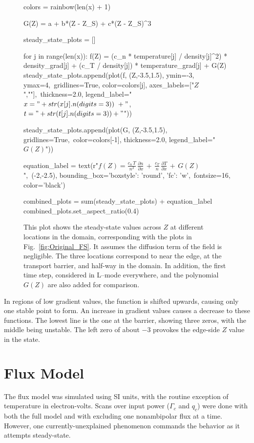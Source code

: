 \begin{figure}[tb]
\begin{sagesilent}
		colors = rainbow(len(x) + 1)

		G(Z) = a + b*(Z - Z_S) + c*(Z - Z_S)^3

		steady_state_plots = []

		for j in range(len(x)):
		    f(Z) = (c_n * temperature[j] / density[j]^2) * density_grad[j] + (c_T / density[j]) * temperature_grad[j] + G(Z)
		    steady_state_plots.append(plot(f, (Z,-3.5,1.5), ymin=-3, ymax=4,\
		    		gridlines=True, color=colors[j], axes_labels=["$Z$",""],\
		    		thickness=2.0, legend_label="$x = " +str(x[j].n(digits=3))\
		    		+"$, $t = " +str(t[j].n(digits=3))+ "$"))

		steady_state_plots.append(plot(G, (Z,-3.5,1.5), gridlines=True,\
				color=colors[-1], thickness=2.0, legend_label="$G(Z)$"))

		equation_label = text(r"$f(Z) = \frac{c_n \, T}{n^2} \, \frac{\partial n}{\partial x} \,+\, \frac{c_T}{n} \, \frac{\partial T}{\partial x} \,+\, G(Z)$",\
				(-2,-2.5), bounding_box={'boxstyle': 'round', 'fc': 'w'},\
				fontsize=16, color='black')

		combined_plots = sum(steady_state_plots) + equation_label
		combined_plots.set_aspect_ratio(0.4)
	\end{sagesilent}
	\sageplot[width=0.9\textwidth]{combined_plots}
	\caption{This plot shows the steady-state values across $Z$ at different locations in the domain, corresponding with the plots in Fig.~\ref{fig:Original_FS}.
	It assumes the diffusion term of the field is negligible.
	The three locations correspond to near the edge, at the transport barrier, and half-way in the domain.
	In addition, the first time step, considered in L--mode everywhere, and the polynomial $G(Z)$ are also added for comparison.}
	\label{fig:original_stationary_vs_Z}
\end{figure}

In regions of low gradient values, the function is shifted upwards, causing only one stable point to form.
An increase in gradient values causes a decrease to these functions.
The lowest line is the one at the barrier, showing three zeros, with the middle being unstable.
The left zero of about $-3$ provokes the edge-side $Z$ value in the state.

\section{Flux Model} \label{sec:flux_results}
The flux model was simulated using SI units, with the routine exception of temperature in electron-volts.
Scans over input power ($\Gamma_c$ and $q_c$) were done with both the full model and with excluding one nonambipolar flux at a time.
However, one currently-unexplained phenomenon commands the behavior as it attempts steady-state.

